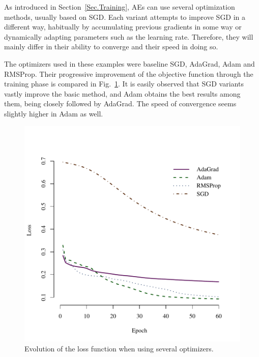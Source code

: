 As introduced in Section~\ref{Sec.Training}, AEs can use several optimization methods, usually based on SGD. Each variant attempts to improve SGD in a different way, habitually by accumulating previous gradients in some way or dynamically adapting parameters such as the learning rate. Therefore, they will mainly differ in their ability to converge and their speed in doing so.

The optimizers used in these examples were baseline SGD, AdaGrad, Adam and RMSProp. Their progressive improvement of the objective function through the training phase is compared in Fig.~\ref{Fig.opt.loss}. It is easily observed that SGD variants vastly improve the basic method, and Adam obtains the best results among them, being closely followed by AdaGrad. The speed of convergence seems slightly higher in Adam as well.

\begin{figure}[htbp]
  \centering
  \includegraphics[width=\figwidth,trim={0 0 0 6em},clip]{optimizers_loss.pdf}
  \caption{\label{Fig.opt.loss}Evolution of the loss function when using several optimizers.}
\end{figure}

\setlength{\figwidth}{\linewidth}

